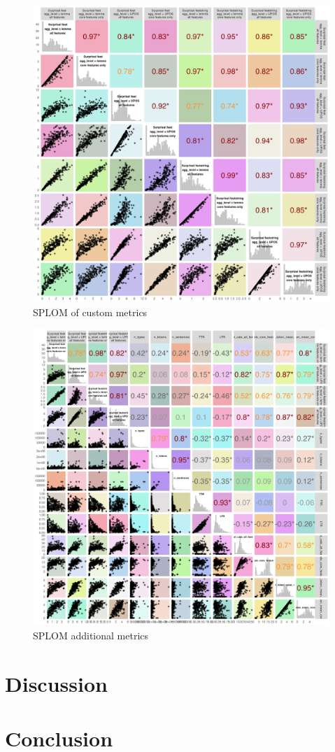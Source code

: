 \documentclass[USenglish]{article}
\begin{document}
\begin{figure}
    \centering
    \includegraphics[width=0.5\linewidth]{latex/graphics/SPLOM_custom_metrics.png}
    \caption{SPLOM of custom metrics}
    \label{fig:SPLOM_custom_metrics}
\end{figure}

\begin{figure}
    \centering
        \includegraphics[width=0.5\linewidth]{latex/graphics/SPLOM_other_metrics.png}
    \caption{SPLOM additional metrics}
    \label{fig:SPLOM_other_metrics}
\end{figure}

\section{Discussion}

\section{Conclusion}





	
\end{document}
